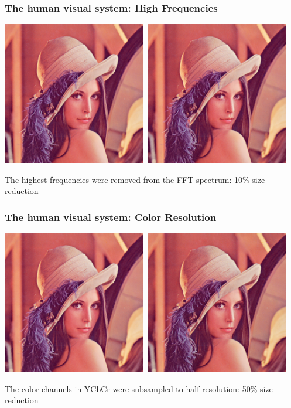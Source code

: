 \documentclass{beamer}
\begin{document}
\begin{frame}
\frametitle{The human visual system: High Frequencies}

\includegraphics[width=0.47\textwidth]{lena}\ 
\includegraphics[width=0.47\textwidth]{lena-lowpass}

The highest frequencies were removed from the FFT spectrum: 10\% size reduction
\end{frame}


\begin{frame}
\frametitle{The human visual system: Color Resolution}

\includegraphics[width=0.47\textwidth]{lena}\ 
\includegraphics[width=0.47\textwidth]{lena-420}

The color channels in YCbCr were subsampled to half resolution: 50\% size reduction
\end{frame}
\end{document}
